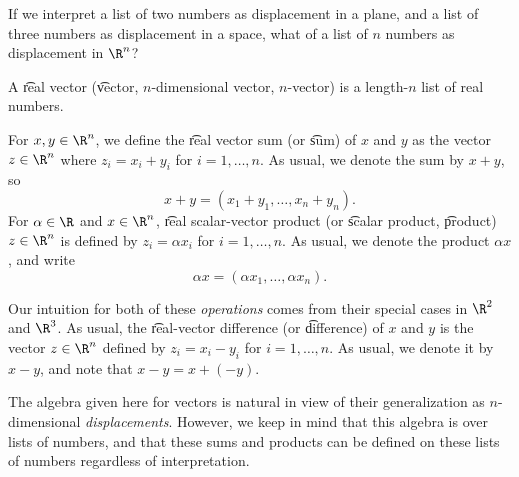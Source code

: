 
If we interpret a list of two numbers as displacement in a plane, and a list of three numbers as displacement in a space, what of a list of $n$ numbers as displacement in $\R^n$?

A \t{real vector} (\t{vector}, \t{$n$-dimensional vector}, \t{$n$-vector}) is a length-$n$ list of real numbers.

For $x, y \in \R^n$, we define the \t{real vector sum} (or \t{sum}) of $x$ and $y$ as the vector $z \in \R^n$ where $z_i = x_i + y_i$ for $i = 1, \dots, n$.
As usual, we denote the sum by $x+y$, so
  \[
x + y = (x_1 +y_1, \dots, x_n + y_n).
  \]
For $\alpha \in \R$ and $x \in \R^n$, \t{real scalar-vector product} (or \t{scalar product}, \t{product}) $z \in \R^{n}$ is defined by $z_i = \alpha x_i$ for $i = 1, \dots, n$.
As usual, we denote the product $\alpha x$, and write
  \[
\alpha x = (\alpha x_1, \dots, \alpha x_n).
  \]

Our intuition for both of these \textit{operations} comes from their special cases in $\R^2$ and $\R^3$.
As usual, the \t{real-vector difference} (or \t{difference}) of $x$ and $y$ is the vector $z \in \R^{n}$ defined by $z_i = x_i - y_i$ for $i = 1, \dots, n$.
As usual, we denote it by $x - y$, and note that $x - y = x + (-y)$.

The algebra given here for vectors is natural in view of their generalization as $n$-dimensional \textit{displacements}.
However, we keep in mind that this algebra is over lists of numbers, and that these sums and products can be defined on these lists of numbers regardless of interpretation.

\blankpage
